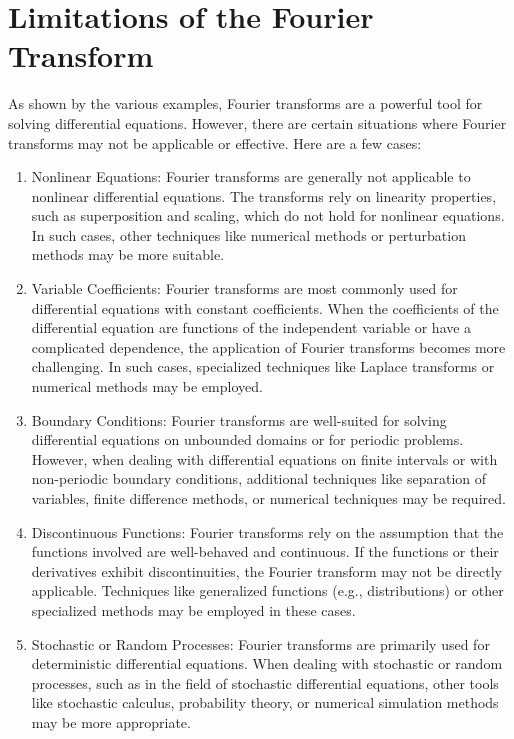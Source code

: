\section{Limitations of the Fourier Transform}
As shown by the various examples, Fourier transforms are a powerful tool for solving differential equations. However, there are certain situations where Fourier transforms may not be applicable or effective. Here are a few cases:

\begin{enumerate}
    \item Nonlinear Equations: Fourier transforms are generally not applicable to nonlinear differential equations. The transforms rely on linearity properties, such as superposition and scaling, which do not hold for nonlinear equations. In such cases, other techniques like numerical methods or perturbation methods may be more suitable.
    \item Variable Coefficients: Fourier transforms are most commonly used for differential equations with constant coefficients. When the coefficients of the differential equation are functions of the independent variable or have a complicated dependence, the application of Fourier transforms becomes more challenging. In such cases, specialized techniques like Laplace transforms or numerical methods may be employed.
    \item Boundary Conditions: Fourier transforms are well-suited for solving differential equations on unbounded domains or for periodic problems. However, when dealing with differential equations on finite intervals or with non-periodic boundary conditions, additional techniques like separation of variables, finite difference methods, or numerical techniques may be required.
    \item Discontinuous Functions: Fourier transforms rely on the assumption that the functions involved are well-behaved and continuous. If the functions or their derivatives exhibit discontinuities, the Fourier transform may not be directly applicable. Techniques like generalized functions (e.g., distributions) or other specialized methods may be employed in these cases.
    \item Stochastic or Random Processes: Fourier transforms are primarily used for deterministic differential equations. When dealing with stochastic or random processes, such as in the field of stochastic differential equations, other tools like stochastic calculus, probability theory, or numerical simulation methods may be more appropriate.
\end{enumerate}